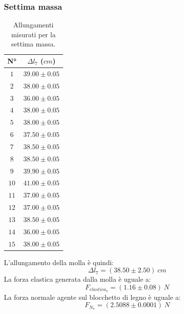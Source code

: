\documentclass[11pt]{article}
\begin{document}
\subsubsection{Settima massa}
\begin{table}[H]
\centering
\begin{tabular}{|c|c|}
\hline
\textbf{N°} & \textbf{$\Delta l_7$ ($cm$)}\\
\hline
$1$ & $39.00\pm 0.05$ \\
\hline
$2$ & $38.00\pm 0.05$ \\
\hline
$3$ & $36.00\pm 0.05$ \\
\hline
$4$ & $38.00\pm 0.05$ \\
\hline
$5$ & $38.00\pm 0.05$ \\
\hline
$6$ & $37.50\pm 0.05$ \\
\hline
$7$ & $38.50\pm 0.05$ \\
\hline
$8$ & $38.50\pm 0.05$ \\
\hline
$9$ & $39.90\pm 0.05$ \\
\hline
$10$ & $41.00\pm 0.05$ \\
\hline
$11$ & $37.00\pm 0.05$ \\
\hline
$12$ & $37.00\pm 0.05$ \\
\hline
$13$ & $38.50\pm 0.05$ \\
\hline
$14$ & $36.00\pm 0.05$ \\
\hline
$15$ & $38.00\pm 0.05$ \\
\hline
\end{tabular}
\caption{Allungamenti misurati per la settima massa.}
\label{tab:}
\end{table}
L'allungamento della molla è quindi:
\begin{equation}
    \Delta l_7=(38.50\pm 2.50)\ cm
\end{equation}
La forza elastica generata dalla molla è uguale a:
\begin{equation}
    F_{elastica_7} = (1.16\pm 0.08)\ N
\end{equation}
La forza normale agente sul blocchetto di legno è uguale a:
\begin{equation}
    F_{N_7} = (2.5088\pm 0.0001)\ N
\end{equation}
\end{document}
